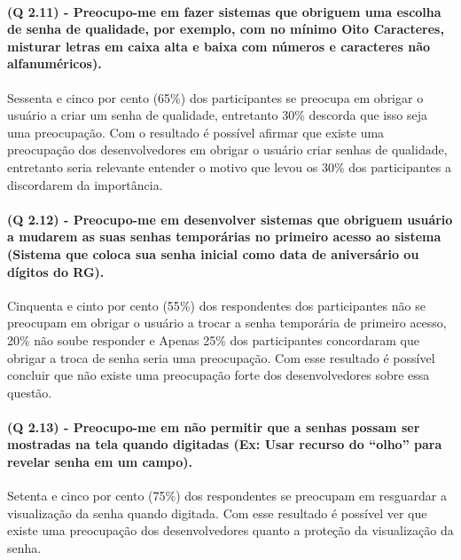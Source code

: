 \paragraph{\textbf{(Q 2.11)} - Preocupo-me em fazer sistemas que obriguem uma escolha de senha de qualidade, por exemplo, com no mínimo Oito Caracteres, misturar letras em caixa alta e baixa com números e caracteres não alfanuméricos).}

Sessenta e cinco por cento (65{\%}) dos participantes se preocupa em obrigar o usuário a criar um senha de qualidade, entretanto 30{\%} descorda que  isso seja uma preocupação. Com o resultado é possível afirmar que existe uma preocupação dos desenvolvedores em obrigar o usuário criar senhas de qualidade, entretanto seria relevante entender o motivo que levou os 30{\%} dos participantes a discordarem da importância. 

\paragraph{\textbf{(Q 2.12)} - Preocupo-me em desenvolver sistemas que obriguem usuário a mudarem as suas senhas temporárias no primeiro acesso ao sistema (Sistema que coloca sua senha inicial como data de aniversário ou dígitos do RG).}

Cinquenta e cinto por cento (55{\%}) dos respondentes dos participantes não se preocupam em obrigar o usuário a trocar a senha temporária de primeiro acesso, 20{\%} não soube responder e Apenas 25{\%} dos participantes concordaram que obrigar a troca de senha seria uma preocupação. Com esse resultado é possível concluir que não existe uma preocupação forte dos desenvolvedores sobre essa questão.

\paragraph{\textbf{(Q 2.13)} - Preocupo-me em não permitir que a senhas possam ser mostradas na tela quando digitadas (Ex: Usar recurso do “olho” para revelar senha em um campo).}

Setenta e cinco por cento (75{\%}) dos respondentes se preocupam em resguardar a visualização da senha quando digitada.  Com esse resultado é possível  ver que existe uma preocupação dos desenvolvedores quanto a proteção da visualização da senha.






